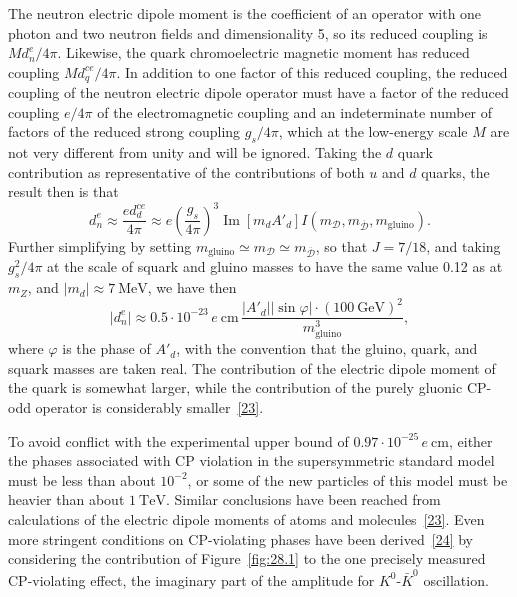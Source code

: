 The neutron electric dipole moment is the coefficient of an operator with
one photon and two neutron fields and dimensionality 5, so its reduced
coupling is \(Md_n^e/4\pi\). Likewise, the quark chromoelectric magnetic
moment has reduced coupling \(Md_q^{ce}/4\pi\). In addition to one factor
of this reduced coupling, the reduced coupling of the neutron electric
dipole operator must have a factor of the reduced coupling \(e/4\pi\) of
the electromagnetic coupling and an indeterminate number of factors of
the reduced strong coupling \(g_s/4\pi\), which at the low-energy scale
\(M\) are not very different from unity and will be ignored. Taking the
\(d\) quark contribution as representative of the contributions of both
\(u\) and \(d\) quarks, the result then is that
\begin{equation}
  d_n^e
  \approx
  \frac{ed_d^{ce}}{4\pi}
  \approx
  e\left(\frac{g_s}{4\pi}\right)^{\!3}
  \operatorname{Im}\left[m_dA'_d\right]
  I(m_{\mathcal{D}},m_{\overline{\mathcal{D}}},
    m_{\mathrm{gluino}}).
  \tag{28.4.17}\label{eq:28.4.17}
\end{equation}
Further simplifying by setting
\(m_{\mathrm{gluino}}\simeq m_{\mathcal{D}}
\simeq m_{\overline{\mathcal{D}}}\), so that \(J=7/18\), and taking
\(g_s^2/4\pi\) at the scale of squark and gluino masses to have the same
value 0.12 as at \(m_Z\), and \(\lvert m_d\rvert\approx7\ \mathrm{MeV}\),
we have then
\begin{equation}
  \lvert d_n^e\rvert
  \approx
  0.5\mathbin{\cdot}10^{-23}\,e\ \mathrm{cm}\,
  \frac{\lvert A'_d\rvert\lvert\sin\varphi\rvert
        \mathbin{\cdot}(100\ \mathrm{GeV})^2}
       {m_{\mathrm{gluino}}^3},
  \tag{28.4.18}\label{eq:28.4.18}
\end{equation}
where \(\varphi\) is the phase of \(A'_d\), with the convention that the
gluino, quark, and squark masses are taken real. The contribution of the
electric dipole moment of the quark is somewhat larger, while the
contribution of the purely gluonic CP-odd operator is considerably
smaller~\hyperref[ch28-ref-23]{[23]}.

To avoid conflict with the experimental upper bound of
\(0.97\mathbin{\cdot}10^{-25}\,e\ \mathrm{cm}\), either the phases
associated with CP violation in the supersymmetric standard model must be
less than about \(10^{-2}\), or some of the new particles of this model
must be heavier than about \(1\ \mathrm{TeV}\). Similar conclusions have
been reached from calculations of the electric dipole moments of atoms
and molecules~\hyperref[ch28-ref-23]{[23]}. Even more stringent conditions
on CP-violating phases have been
derived~\hyperref[ch28-ref-24]{[24]} by considering the contribution of
Figure~\ref{fig:28.1} to the one precisely measured CP-violating effect,
the imaginary part of the amplitude for \(K^0\)-\(\bar K^0\) oscillation.
